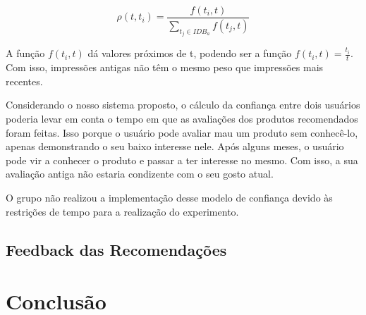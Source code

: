 \begin{equation}
 \rho(t,t_i) = \frac{f(t_i,t)}{{\sum_{t_j\in{IDB_a}}}f(t_j,t)}
 \label{eq:rho_t} 
\end{equation}

 A função $f(t_i,t)$ dá valores próximos de t, podendo ser a função $f(t_i,t) = \frac{t_i}{t}$. Com isso, impressões antigas não têm o mesmo peso que impressões mais recentes.

 Considerando o nosso sistema proposto, o cálculo da confiança entre dois usuários poderia levar em conta o tempo em que as avaliações dos produtos recomendados foram feitas. Isso porque o usuário pode avaliar mau um produto sem conhecê-lo, apenas demonstrando o seu baixo interesse nele. Após alguns meses, o usuário pode vir a conhecer o produto e passar a ter interesse no mesmo. Com isso, a sua avaliação antiga não estaria condizente com o seu gosto atual.
 
 O grupo não realizou a implementação desse modelo de confiança devido às restrições de tempo para a realização do experimento.


\subsection{Feedback das Recomendações} %
\label{sub:feedback_das_recomendacoes}




\section{Conclusão}
\label{conclusao}



